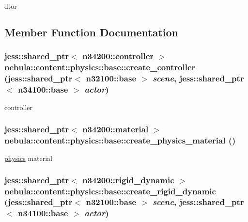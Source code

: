 dtor 

\subsection{Member Function Documentation}
\hypertarget{classnebula_1_1content_1_1physics_1_1base_a59cf1db2c6a98d9054db303a71019621}{
\subsubsection[{create\_\-controller}]{\setlength{\rightskip}{0pt plus 5cm}jess::shared\_\-ptr$<$ {\bf n34200::controller} $>$ nebula::content::physics::base::create\_\-controller (jess::shared\_\-ptr$<$ {\bf n32100::base} $>$ {\em scene}, \/  jess::shared\_\-ptr$<$ {\bf n34100::base} $>$ {\em actor})}}
\label{classnebula_1_1content_1_1physics_1_1base_a59cf1db2c6a98d9054db303a71019621}


controller \hypertarget{classnebula_1_1content_1_1physics_1_1base_a6c7e79271697c678c8634a5e5dbe976e}{
\subsubsection[{create\_\-physics\_\-material}]{\setlength{\rightskip}{0pt plus 5cm}jess::shared\_\-ptr$<$ {\bf n34200::material} $>$ nebula::content::physics::base::create\_\-physics\_\-material ()}}
\label{classnebula_1_1content_1_1physics_1_1base_a6c7e79271697c678c8634a5e5dbe976e}


\hyperlink{namespacenebula_1_1content_1_1physics}{physics} material \hypertarget{classnebula_1_1content_1_1physics_1_1base_a7a8b7ec354839b2d87ab5ef8b20e5da2}{
\subsubsection[{create\_\-rigid\_\-dynamic}]{\setlength{\rightskip}{0pt plus 5cm}jess::shared\_\-ptr$<$ {\bf n34200::rigid\_\-dynamic} $>$ nebula::content::physics::base::create\_\-rigid\_\-dynamic (jess::shared\_\-ptr$<$ {\bf n32100::base} $>$ {\em scene}, \/  jess::shared\_\-ptr$<$ {\bf n34100::base} $>$ {\em actor})}}
\label{classnebula_1_1content_1_1physics_1_1base_a7a8b7ec354839b2d87ab5ef8b20e5da2}



